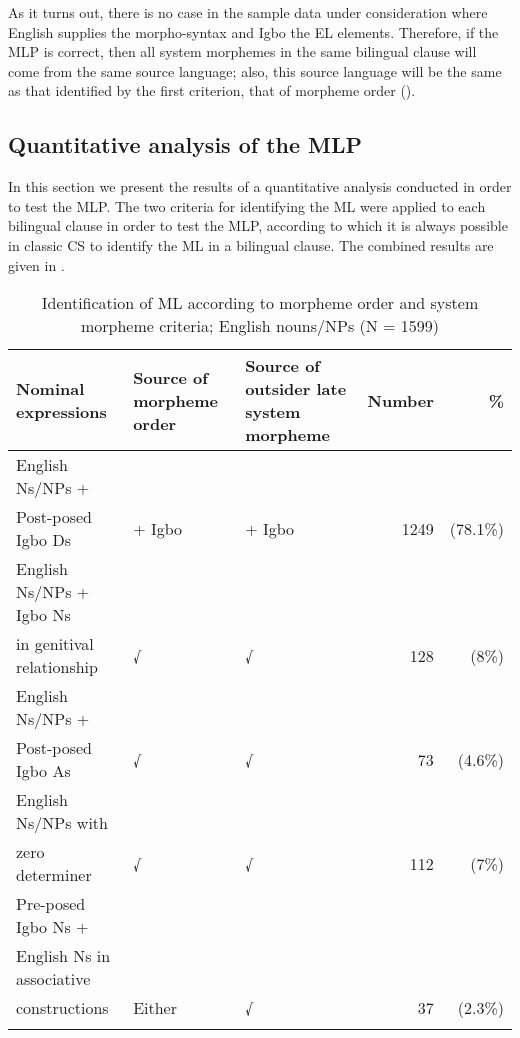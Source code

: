 \documentclass[output=paper]{langsci/langscibook}
\begin{document}
As it turns out, there is no case in the sample data under consideration where English supplies the morpho-syntax and Igbo the EL elements. Therefore, if the MLP is correct, then all system morphemes in the same bilingual clause will come from the same source language; also, this source language will be the same as that identified by the first criterion, that of morpheme order ().

\subsection{Quantitative analysis of the MLP}

In this section we present the results of a quantitative analysis conducted in order to test the MLP. The two criteria for identifying the ML were applied to each bilingual clause in order to test the MLP, according to which it is always possible in classic CS to identify the ML in a bilingual clause. The combined results are given in . 
 
\begin{table}
\caption{Identification of ML according to morpheme order and system morpheme criteria; {English nouns/NPs (N = 1599)}}

\begin{tabularx}{\textwidth}{Xp{2cm}p{2cm}rr}
\lsptoprule
Nominal expressions                                             & Source of morpheme order & Source of outsider late system morpheme & Number & \% \\
\midrule
English Ns/NPs + \\
Post-posed Igbo Ds                   & + Igbo   &   + Igbo & 1249 & (78.1\%) \\
English Ns/NPs + Igbo Ns \\
in genitival relationship             &     √     &    √       & 128 & (8\%)     \\
English Ns/NPs + \\
Post-posed Igbo As                            &  √      &     √      &  73  &(4.6\%)   \\

English Ns/NPs with \\
zero determiner                            &  √     &      √      &  112  &(7\%)   \\

Pre-posed Igbo Ns + \\
English Ns in associative \\
constructions   &   Either    &       √      & 37 & (2.3\%)   \\
\lspbottomrule
\end{tabularx}
\label{tab:Ihemere:2}
\end{table} 
\end{document}
